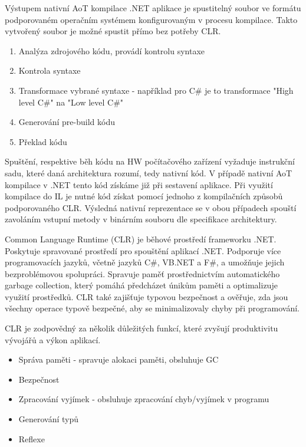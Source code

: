 
Výstupem nativní AoT kompilace .NET aplikace je spustitelný soubor ve formátu podporovaném operačním systémem konfigurovaným v procesu kompilace. Takto vytvořený soubor je možné spustit přímo bez potřeby CLR. 


\begin{enumerate}
    \item Analýza zdrojového kódu, provádí kontrolu syntaxe
    \item Kontrola syntaxe
    \item Transformace vybrané syntaxe - například pro C\# je to transformace "High level C\#" na "Low level C\#"
    \item Generování pre-build kódu 
    \item Překlad kódu
\end{enumerate}


Spuštění, respektive běh kódu na HW počítačového zařízení vyžaduje instrukční sadu, které daná architektura rozumí, tedy nativní kód. V případě nativní AoT kompilace v .NET tento kód získáme již při sestavení aplikace. Při využití kompilace do IL je nutné kód získat pomocí jednoho z kompilačních způsobů podporovaného CLR. Výsledná nativní reprezentace se v obou případech spouští zavoláním vstupní metody v binárním souboru dle specifikace architektury.


Common Language Runtime (CLR) je běhové prostředí frameworku .NET. Poskytuje spravované prostředí pro spouštění aplikací .NET. Podporuje více programovacích jazyků, včetně jazyků C\#, VB.NET a F\#, a umožňuje jejich bezproblémovou spolupráci. Spravuje paměť prostřednictvím automatického garbage collection, který pomáhá předcházet únikům paměti a optimalizuje využití prostředků. CLR také zajišťuje typovou bezpečnost a ověřuje, zda jsou všechny operace typově bezpečné, aby se minimalizovaly chyby při programování.


CLR je zodpovědný za několik důležitých funkcí, které zvyšují produktivitu vývojářů a výkon aplikací.

\begin{itemize}
    \item Správa paměti - spravuje alokaci paměti, obsluhuje GC
    \item Bezpečnost
    \item Zpracování vyjímek - obsluhuje zpracování chyb/vyjímek v programu
    \item Generování typů 
    \item Reflexe
\end{itemize}


